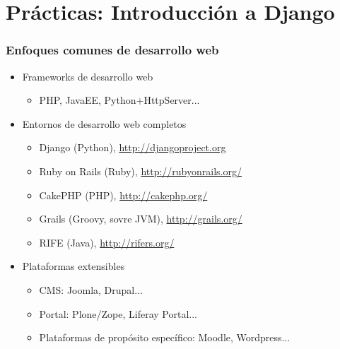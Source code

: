 %

\section{Prácticas: Introducción a Django}

\begin{frame}
\frametitle{Enfoques comunes de desarrollo web}

\begin{itemize}
\item Frameworks de desarrollo web
  \begin{itemize}
  \item PHP, JavaEE, Python+HttpServer...
  \end{itemize}
\item Entornos de desarrollo web completos
  \begin{itemize}
  \item Django (Python), \url{http://djangoproject.org}
  \item Ruby on Rails (Ruby), \url{http://rubyonrails.org/}
  \item CakePHP (PHP), \url{http://cakephp.org/}
  \item Grails (Groovy, sovre JVM), \url{http://grails.org/}
  \item RIFE (Java), \url{http://rifers.org/}
  \end{itemize}
\item Plataformas extensibles
  \begin{itemize}
  \item CMS: Joomla, Drupal...
  \item Portal: Plone/Zope, Liferay Portal...
  \item Plataformas de propósito específico: Moodle, Wordpress...
  \end{itemize}
\end{itemize}

\end{frame}


